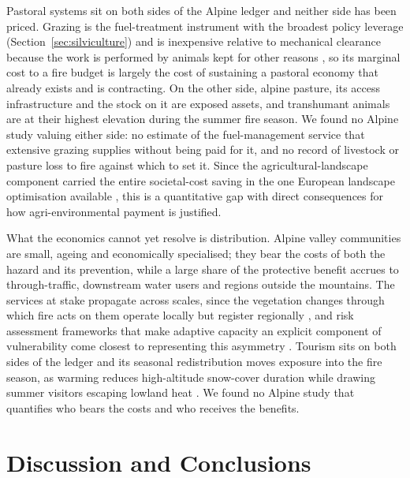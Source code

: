 \documentclass[11pt,a4paper]{article}
\begin{document}
Pastoral systems sit on both sides of the Alpine ledger and neither side has been priced. Grazing is the fuel-treatment instrument with the broadest policy leverage (Section~\ref{sec:silviculture}) and is inexpensive relative to mechanical clearance because the work is performed by animals kept for other reasons \citep{xu_how_2026}, so its marginal cost to a fire budget is largely the cost of sustaining a pastoral economy that already exists and is contracting. On the other side, alpine pasture, its access infrastructure and the stock on it are exposed assets, and transhumant animals are at their highest elevation during the summer fire season. We found no Alpine study valuing either side: no estimate of the fuel-management service that extensive grazing supplies without being paid for it, and no record of livestock or pasture loss to fire against which to set it. Since the agricultural-landscape component carried the entire societal-cost saving in the one European landscape optimisation available \citep{lecinadiaz_incorporating_2023}, this is a quantitative gap with direct consequences for how agri-environmental payment is justified.

What the economics cannot yet resolve is distribution. Alpine valley communities are small, ageing and economically specialised; they bear the costs of both the hazard and its prevention, while a large share of the protective benefit accrues to through-traffic, downstream water users and regions outside the mountains. The services at stake propagate across scales, since the vegetation changes through which fire acts on them operate locally but register regionally \citep{vukomanovic_systematic_2019}, and risk assessment frameworks that make adaptive capacity an explicit component of vulnerability come closest to representing this asymmetry \citep{riviere_mapping_2023, lecinadiaz_assessing_2021}. Tourism sits on both sides of the ledger and its seasonal redistribution moves exposure into the fire season, as warming reduces high-altitude snow-cover duration while drawing summer visitors escaping lowland heat \citep{pede_mountain_2022, abrham_wildfires_2024}. We found no Alpine study that quantifies who bears the costs and who receives the benefits.


\section{Discussion and Conclusions}
\end{document}
